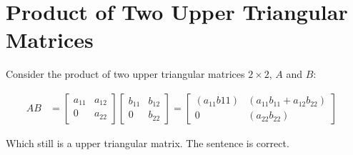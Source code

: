 \section{Product of Two Upper Triangular Matrices}
	
	Consider the product of two upper triangular matrices $2 \times 2$, $A$ and $B$:

	\begin{align}
		AB &= \begin{bmatrix}
				a_{11} & a_{12} \\[0.3em]
				0 & a_{22}
			\end{bmatrix}
			\begin{bmatrix}
				b_{11} & b_{12} \\[0.3em]
				0 & b_{22}
			\end{bmatrix} = \begin{bmatrix}
				(a_{11}b{11}) & (a_{11}b_{11} + a_{12}b_{22}) \\[0.3em]
				0 & (a_{22}b_{22})
			\end{bmatrix}&
	\label{eq:62}
	\end{align}

	Which still is a upper triangular matrix. The sentence is correct.